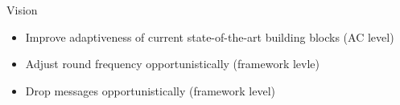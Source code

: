 \begin{frame}{\playfairblack Vision}
  \begin{card}
    \begin{itemize}
      \item Improve adaptiveness of current state-of-the-art building blocks (AC level)
      \item Adjust round frequency opportunistically (framework levle)
      \item Drop messages opportunistically (framework level)
    \end{itemize}
  \end{card}
\end{frame}
